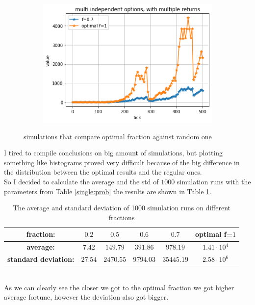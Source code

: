 \documentclass{article}
\begin{document}
\begin{figure}[!h]
\begin{subfigure}{0.525\textwidth}
		\end{subfigure}
		\begin{subfigure}{0.525\textwidth}
			\includegraphics[width=0.9\linewidth]{single4}
		\end{subfigure}
		\caption{simulations that compare optimal fraction against random one}
		\label{Fig:single1}
	\end{figure}
	\newpage
	I tired to compile conclusions on big amount of simulations, but plotting something like histograms proved very difficult because of the big difference in the distribution between the optimal results and the regular ones.\\
	So I decided to calculate the average and the std of $1000$ simulation runs with the parameters from Table \ref{single:prob} the results are shown in Table \ref{single:results}.\\
	\begin{table}[!h]
		\centering\begin{tabular}{|c||c|c|c|c|c|}
			\hline
			\textbf{fraction:} & $0.2$ & $0.5$ & $0.6$ & $0.7$ & optimal f=$1$ \\ 
			\hline\hline
			\textbf{average:}  & $7.42$ & $149.79$ & $391.86$ & $978.19$ & $1.41 \cdot 10^4$ \\
			\hline
			\textbf{standard deviation:}  & $27.54$ & $2470.55$ & $9794.03$ & $35445.19$ & $2.58\cdot 10^6$  \\
			\hline
		\end{tabular}
		\caption{The average and standard deviation of 1000 simulation runs on different fractions}
		\label{single:results}
	\end{table}\\
	As we can clearly see the closer we got to the optimal fraction we got higher average fortune, however the deviation also got bigger.
	\newpage
\end{document}
